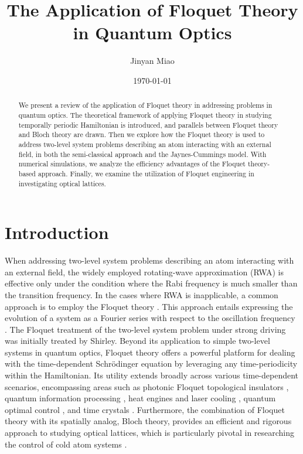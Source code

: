 \documentclass[reprint, amsmath, amssymb, aps]{revtex4-2}
\begin{document}
\title{The Application of Floquet Theory in Quantum Optics}

\author{Jinyan Miao}
\hfill\break
\date{\today}


\begin{abstract}
We present a review of the application of Floquet theory in addressing problems in quantum optics. The theoretical framework of applying Floquet theory in studying temporally periodic Hamiltonian is introduced, and parallels between Floquet theory and Bloch theory are drawn. 
Then we explore how the Floquet theory is used to address two-level system problems describing an atom interacting with an external field, in both the semi-classical approach and the Jaynes-Cummings model. With numerical simulations, we analyze the efficiency advantages of the Floquet theory-based approach. Finally, we examine the utilization of Floquet engineering in investigating optical lattices.
\end{abstract}

\maketitle

\section{\label{sec:level1}Introduction}
When addressing two-level system problems describing an atom interacting with an external field, the widely employed rotating-wave approximation (RWA) is effective only under the condition where the Rabi frequency is much smaller than the transition frequency. In the cases where RWA is inapplicable, a common approach is to employ the Floquet theory \cite{Shirley, Engelhardt, Wang}. This approach entails expressing the evolution of a system as a Fourier series with respect to the oscillation frequency \cite{Campaioli, Viebahn}. The Floquet treatment of the two-level system problem under strong driving was initially treated by Shirley. Beyond its application to simple two-level systems in quantum optics, Floquet theory offers a powerful platform for dealing with the time-dependent Schrödinger equation by leveraging any time-periodicity within the Hamiltonian. Its utility extends broadly across various time-dependent scenarios, encompassing areas such as photonic Floquet topological insulators \cite{Rechtsman}, quantum information processing \cite{88}, heat engines and laser cooling \cite{89}, quantum optimal control \cite{90,91}, and time crystals \cite{92,93}. Furthermore, the combination of Floquet theory with its spatially analog, Bloch theory, provides an efficient and rigorous approach to studying optical lattices, which is particularly pivotal in researching the control of cold atom systems \cite{Viebahn, Sandholzer, Anderson}.\\
\end{document}
